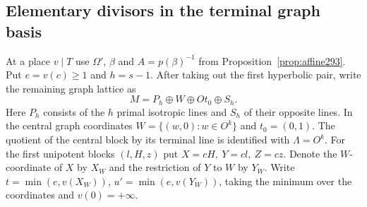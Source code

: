 \documentclass[a4paper,11pt]{article}
\theoremstyle{definition}
\theoremstyle{remark}
\numberwithin{equation}{section}
\begin{document}
\subsection{Elementary divisors in the terminal graph basis}\label{nav:IV-50}
At a place \(v\mid T\) use \(\Omega'\), \(\beta\) and
\(A=p(\beta)^{-1}\) from Proposition~\ref{prop:affine293}.
Put \(e=v(c)\ge1\) and \(h=s-1\). After taking out the
first hyperbolic pair, write the remaining graph lattice as
\[
  M=P_h\oplus W\oplus O t_0\oplus S_h .
\]
Here \(P_h\) consists of the \(h\) primal isotropic lines
and \(S_h\) of their opposite lines. In the central graph
coordinates \(W=\{(w,0):w\in O^k\}\) and \(t_0=(0,1)\).
The quotient of the central block by its terminal line
is identified with \(\Lambda=O^k\). For the first unipotent
blocks \((l,H,z)\) put \(X=cH,\ Y=cl,\ Z=cz\). Denote the
\(W\)-coordinate of \(X\) by \(X_W\) and the restriction
of \(Y\) to \(W\) by \(Y_W\). Write
\(t=\min(e,v(X_W))\), \(u'=\min(e,v(Y_W))\), taking the
minimum over the coordinates and \(v(0)=+\infty\).
\end{document}
